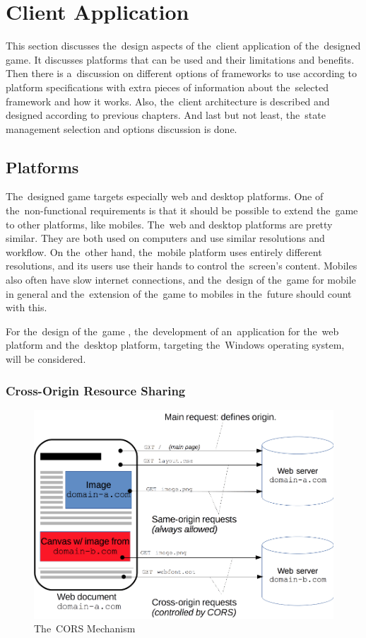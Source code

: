 \section{Client Application}
\label{design:client-application}

This section discusses the~design aspects of the~client application of the~designed game.
It discusses platforms that can be used and their limitations and benefits.
Then there is a~discussion on different options of frameworks to use according to platform specifications with extra pieces of information about the~selected framework and how it works.
Also, the~client architecture is described and designed according to previous chapters. 
And last but not least, the~state management selection and options discussion is done.

\subsection{Platforms}

The~designed game targets especially web and desktop platforms.
One of the~non-functional requirements is that it should be possible to extend the~game to other platforms, like mobiles.
The~web and desktop platforms are pretty similar.
They are both used on computers and use similar resolutions and workflow.
On the~other hand, the~mobile platform uses entirely different resolutions, and its users use their hands to control the~screen's content.
Mobiles also often have slow internet connections, and the~design of the~game for mobile in general and the~extension of the~game to mobiles in the~future should count with this.

For the~design of the~game \myAppName{}, the~development of an~application for the~web platform and the~desktop platform, targeting the~Windows operating system, will be considered.

\subsubsection{Cross-Origin Resource Sharing}

\begin{figure}
    \centering
    \includegraphics[width=1\linewidth]{assets/design/cors.png}
    \caption{The~CORS Mechanism}
    \label{fig:design:cors-mechanism}
\end{figure}

